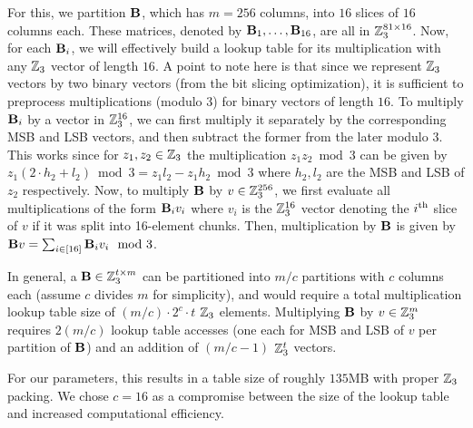 For this, we partition $\mat{B}$, which has $m=256$ columns, into $16$ slices of $16$ columns each. These matrices, denoted by $\mat{B}_1,\dots, \mat{B}_{16}$, are all in $\mathbb{Z}_3^{81 \times 16}$. Now, for each $\mat{B}_i$, we will effectively build a lookup table for its multiplication with any $\mathbb{Z}_3$ vector of length $16$. A point to note here is that since we  represent $\mathbb{Z}_3$ vectors by two binary vectors (from the bit slicing optimization), it is sufficient to preprocess multiplications (modulo 3) for binary vectors of length $16$. To multiply $\mat{B}_{i}$ by a vector in $\mathbb{Z}_3^{16}$, we can first multiply it separately by the corresponding MSB and LSB vectors, and then subtract the former from the later modulo 3. This works since for $z_1, z_2 \in \mathbb{Z}_3$ the multiplication $z_1z_2 \bmod 3$ can be given by $z_1(2\cdot h_2 + l_2) \bmod 3 = z_1l_2 - z_1h_2 \bmod 3$ where $h_2, l_2$ are the MSB and LSB of $z_2$ respectively. Now, to multiply $\mat{B}$ by $v \in \mathbb{Z}_3^{256}$, we first evaluate all multiplications of the form $\mat{B}_iv_i$ where $v_i$ is the $\mathbb{Z}_3^{16}$ vector denoting the $i^{\textnormal{th}}$ slice of $v$ if it was split into 16-element chunks. Then, multiplication by $\mat{B}$ is given by $\mat{B}v = \sum_{i \in [16]} \mat{B}_i v_i \mod 3$.


In general, a $\mat{B} \in \Z_3^{t \times m}$ can be partitioned into $m/c$ partitions with $c$ columns each (assume $c$ divides $m$ for simplicity), and would require a total multiplication lookup table size of $(m/c) \cdot 2^c \cdot t$ $\mathbb{Z}_3$ elements. Multiplying $\mat{B}$ by $v \in \mathbb{Z}_3^{m}$ requires $2(m/c)$ lookup table accesses (one each for MSB and LSB of $v$ per partition of $\mat{B}$) and an addition of $(m/c - 1)$ $\mathbb{Z}_3^{t}$ vectors.


For our parameters, this results in a table size of roughly $135$MB with proper $\mathbb{Z}_3$ packing. We chose $c = 16$ as a compromise between the size of the lookup table and increased computational efficiency.














